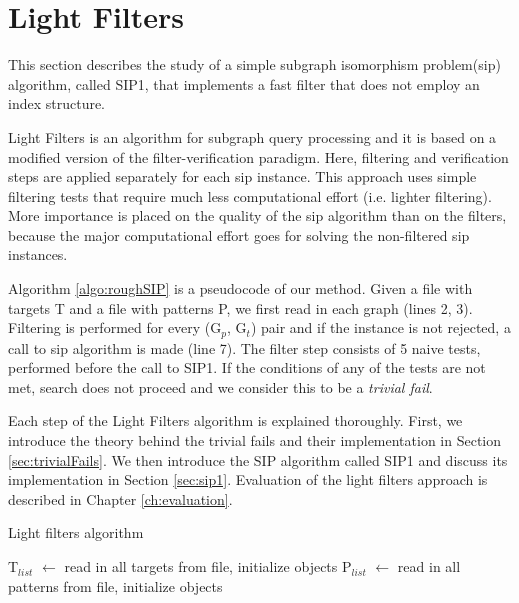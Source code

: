 \documentclass{l4proj}
\begin{document}

\chapter{Light Filters}
\label{ch:sip1}
This section describes the study of a simple subgraph isomorphism problem(\gls{sip}) algorithm, called SIP1, that implements a fast filter that does not employ an index structure.

Light Filters is an algorithm for subgraph query processing and it is based on a modified version of the filter-verification paradigm. Here, filtering and verification steps are applied separately for each \gls{sip} instance. This approach uses simple filtering tests that require much less computational effort (i.e. lighter filtering). More importance is placed on the quality of the \gls{sip} algorithm than on the filters, because the major computational effort goes for solving the non-filtered \gls{sip} instances. 

Algorithm \ref{algo:roughSIP} is a pseudocode of our method. Given a file with targets T and a file with patterns P, we first read in each graph (lines 2, 3). Filtering is performed for every (G$_{p}$, G$_{t}$) pair and if the instance is not rejected, a call to \gls{sip} algorithm is made (line 7). The filter step consists of 5 naive tests, performed before the call to SIP1. If the conditions of any of the tests are not met, search does not proceed and we consider this to be a \textit{trivial fail}. 

Each step of the Light Filters algorithm is explained thoroughly. First, we introduce the theory behind the trivial fails and their implementation in Section \ref{sec:trivialFails}. We then introduce the SIP algorithm called SIP1 and discuss its implementation in Section \ref{sec:sip1}. Evaluation of the light filters approach is described in Chapter \ref{ch:evaluation}.

\begin{algorithm}
\centering
\caption{Light filters algorithm}
\label{algo:roughSIP}
\begin{algorithmic}[1]
 
\State T$_{list}$ $\gets$ read in all targets from file, initialize objects
\State P$_{list}$ $\gets$ read in all patterns from file, initialize objects
		 
    	\EndIf
    \EndFor
\EndFor
\EndProcedure
\end{algorithmic}
\end{algorithm}
\end{document}
